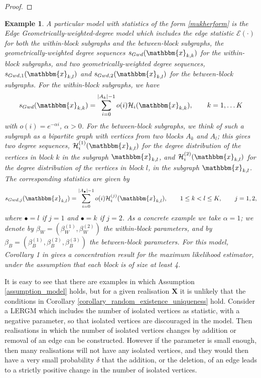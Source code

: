 \documentclass{article}
\newtheorem{Example}[Theorem]{Example}
\begin{document}
\begin{proof}
\end{proof}

\begin{Example}
A particular model with statistics of the form \eqref{mukherform} is the  Edge Geometrically-weighted-degree model which includes the edge statistic $\mathcal{E}(\cdot)$ for both the within-block subgraphs and the between-block subgraphs,  the geometrically-weighted degree sequences $s_{Gwd}(\mathbbm{x}_{k,k})$ for the within-block subgraphs,  and two geometrically-weighted degree sequences, $s_{Gwd,1}(\mathbbm{x}_{k,l})$ and $s_{Gwd,2}(\mathbbm{x}_{k,l})$ for the between-block subgraphs. For the within-block subgraphs, we have
\begin{align*}
    s_{Gwd}(\mathbbm{x}_{k,k})= \sum_{i=0}^{\vert A_k \vert-1}o(i)\mathcal{H}_i(\mathbbm{x}_{k,k}), \qquad k=1,\ldots K
\end{align*}
with $o(i) = e^{-\alpha i}$, $\alpha>0$. For the between-block subgraphs, we think of such a subgraph as a bipartite graph with vertices from two blocks $A_k$ and $A_l$; this gives two degree sequences,  $\mathcal{H}_i^{(1)}(\mathbbm{x}_{k,l})$ for the degree distribution of the vertices in block $k$ in the subgraph $\mathbbm{x}_{k,l}$, 
and $\mathcal{H}_i^{(2)}(\mathbbm{x}_{k,l})$ for the degree distribution of the vertices in block $l$,  in the subgraph $\mathbbm{x}_{k,l}$. The corresponding statistics are  given by
\begin{align*}
    s_{Gwd,j}(\mathbbm{x}_{k,l})= \sum_{i=0}^{\vert A_{\bullet} \vert-1}o(i)\mathcal{H}_i^{(j)}(\mathbbm{x}_{k,l}), \qquad 1 \leq k<l \leq  K, \quad \quad {j=1,2},
\end{align*}
where $\bullet=l$ if $j=1$ and $\bullet=k$ if $j=2$. As a concrete example we take $\alpha=1$; we denote by  $\beta_W=(\beta_W^{(1)}, \beta_W^{(2)})$ the within-block parameters,  and by $\beta_B=(\beta_B^{(1)}, \beta_B^{(2)}, \beta_B^{(3)})$  the between-block parameters. 
For this model, Corollary 1 in \cite{schweinberger2020concentration} gives a concentration result for the maximum likelihood estimator, under the assumption that each block is of size at least 4.
\end{Example}

It is easy to see that there are examples in which Assumption \ref{assumption_model} holds, but for a given realisation $\mathbf{X}$ it is unlikely that the conditions in Corollary \ref{corollary_random_existence_uniqueness} hold. Consider a LERGM which includes the number of isolated vertices as statistic, with a negative parameter, so that isolated vertices are discouraged in the model. Then realisations in which the number of isolated vertices changes by addition or removal of an edge can be constructed. However  if the parameter is small enough, then many realisations will not have any isolated vertices, and they would then have a very small probability $\delta$ that the addition, or the deletion, of an edge leads to a strictly positive change in the number of isolated vertices.
\end{document}

